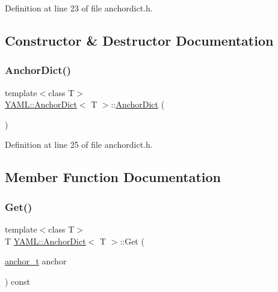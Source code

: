 Definition at line 23 of file anchordict.\+h.



\subsection{Constructor \& Destructor Documentation}
\mbox{\label{class_y_a_m_l_1_1_anchor_dict_a2472cae3dce3afbb39023be24376dcaa}} 
\subsubsection{\texorpdfstring{AnchorDict()}{AnchorDict()}}
{\footnotesize\ttfamily template$<$class T$>$ \\
\mbox{\hyperlink{class_y_a_m_l_1_1_anchor_dict}{Y\+A\+M\+L\+::\+Anchor\+Dict}}$<$ T $>$\+::\mbox{\hyperlink{class_y_a_m_l_1_1_anchor_dict}{Anchor\+Dict}} (\begin{DoxyParamCaption}{ }\end{DoxyParamCaption})\hspace{0.3cm}{\ttfamily [inline]}}



Definition at line 25 of file anchordict.\+h.



\subsection{Member Function Documentation}
\mbox{\label{class_y_a_m_l_1_1_anchor_dict_acbdb0e5aa6b28ce1caa6b8cc7074cc01}} 
\subsubsection{\texorpdfstring{Get()}{Get()}}
{\footnotesize\ttfamily template$<$class T$>$ \\
T \mbox{\hyperlink{class_y_a_m_l_1_1_anchor_dict}{Y\+A\+M\+L\+::\+Anchor\+Dict}}$<$ T $>$\+::Get (\begin{DoxyParamCaption}\item[{\mbox{\hyperlink{namespace_y_a_m_l_abeff1798814ae3402fc5665fdcad1de6}{anchor\+\_\+t}}}]{anchor }\end{DoxyParamCaption}) const\hspace{0.3cm}{\ttfamily [inline]}}



